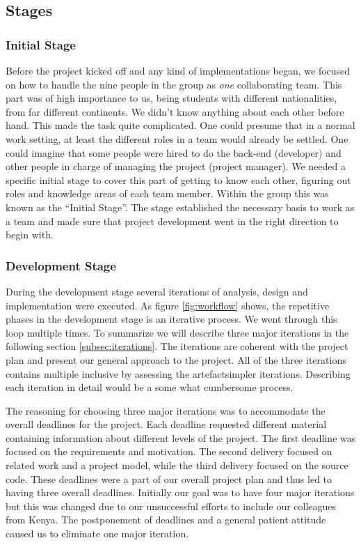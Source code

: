 \subsection{Stages} \label{subsec:stages}

\subsubsection{Initial Stage}
Before the project kicked off and any kind of implementations began, we focused on how to handle the nine people in the group as \textit{one} collaborating team. 
This part was of high importance to us, being students with different nationalities, from far different continents. We didn't know anything about each other before hand. This made the task quite complicated. One could presume that in a normal work setting, at least the different roles in a team would already be settled. One could imagine that some people were hired to do the back-end (developer) and other people in charge of managing the project (project manager). 
We needed a specific initial stage to cover this part of getting to know each other, figuring out roles and knowledge areas of each team member. Within the group this was known as the ``Initial Stage''. The stage established the necessary basis to work as a team and made sure that project development went in the right direction to begin with.

\subsubsection{Development Stage}
During the development stage several iterations of analysis, design and implementation were executed. As figure \ref{fig:workflow} shows, the repetitive phases in the development stage is an iterative process. We went through this loop multiple times. To summarize we will describe three major iterations in the following section \ref{subsec:iterations}. 
The iterations are coherent with the project plan and present our general approach to the project. All of the three iterations contains multiple inclusive \textemdash by assessing the artefact\textemdash simpler iterations. Describing each iteration in detail would be a some what cumbersome process.

The reasoning for choosing three major iterations was to accommodate the overall deadlines for the project. Each deadline requested different material containing information about different levels of the project. The first deadline was focused on the requirements and motivation. The second delivery focused on related work and a project model, while the third delivery focused on the source code. These deadlines were a part of our overall project plan and thus led to having three overall deadlines. Initially our goal was to have four major iterations but this was changed due to our unsuccessful efforts to include our colleagues from Kenya. The postponement of deadlines and a general patient attitude caused us to eliminate one major iteration. 

